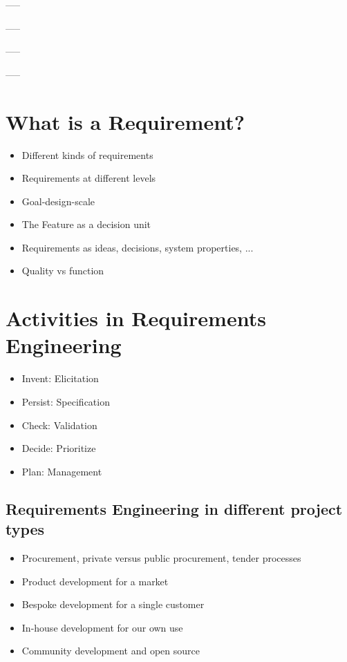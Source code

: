 -----

-----

-----
 
-----

\section{What is a Requirement?}

\begin{itemize}
  \item Different kinds of requirements
  \item Requirements at different levels
  \item Goal-design-scale
  \item The Feature as a decision unit
  \item Requirements as ideas, decisions, system properties, ...
  \item Quality vs function
\end{itemize}

\section{Activities in Requirements Engineering}

\begin{itemize}
  \item Invent: Elicitation
  \item Persist: Specification
  \item Check: Validation
  \item Decide: Prioritize
  \item Plan: Management
\end{itemize}

\subsection{Requirements Engineering in different project types}

\begin{itemize}
  \item Procurement, private versus public procurement, tender processes
  \item Product development for a market
  \item Bespoke development for a single customer
  \item In-house development for our own use
  \item Community development and open source
\end{itemize}


